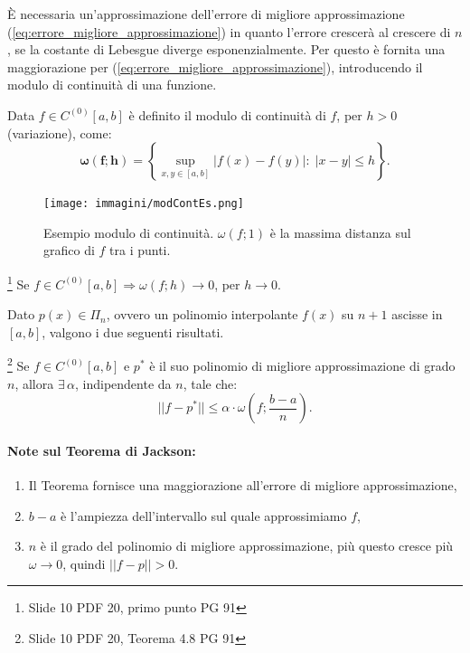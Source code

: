 È necessaria un'approssimazione dell'errore di migliore approssimazione (\ref{eq:errore_migliore_approssimazione}) in quanto l'errore crescerà al crescere di $n$, se la costante di Lebesgue diverge esponenzialmente. Per questo è fornita una maggiorazione per (\ref{eq:errore_migliore_approssimazione}), introducendo il modulo di continuità di una funzione.

\begin{definition}
    Data $f\in C^{(0)}[a,b]$ è definito il modulo di continuità di $f$, per $h>0$ (variazione), come:
    \begin{equation}\label{eq:modulo_continuità}
        \boldsymbol{\omega(f;h)}=\left\{\underset{x,y\in [a,b]}{\sup}|f(x)-f(y)|:\; |x-y|\leq h\right\}.
    \end{equation}
\end{definition}

\begin{figure}
    \centering
    \texttt{[image: immagini/modContEs.png]}
    \caption{Esempio modulo di continuità. $\omega (f;1)$ è la massima distanza sul grafico di $f$ tra i punti.}\label{fig:modContEs}
\end{figure}

\begin{theorem}\label{th:modulo_continuità}\footnote{Slide 10 PDF 20, primo punto PG 91}
    Se $f\in C^{(0)}[a,b]\Rightarrow\omega (f;h)\rightarrow 0$, per $h\rightarrow 0$.
\end{theorem}

Dato $p(x)\in\Pi_n$, ovvero un polinomio interpolante $f(x)$ su $n+1$ ascisse in $[a,b]$, valgono i due seguenti risultati.

\begin{theorem}[Jackson]\label{th:Jackson}\footnote{Slide 10 PDF 20, Teorema 4.8 PG 91}
    Se $f\in C^{(0)}[a,b]$ e $p^*$ è il suo polinomio di migliore approssimazione di grado $n$, allora $\exists\, \alpha$, indipendente da $n$, tale che:
    \begin{equation}\label{eq:approssimazione_jackson}
        ||f-p^*||\leq \alpha\cdot\omega\left(f;\frac{b-a}{n}\right).
    \end{equation}
\end{theorem}

\paragraph{Note sul Teorema di Jackson:}
\begin{enumerate}
	\item Il Teorema fornisce una maggiorazione all'errore di migliore approssimazione,
	\item $b-a$ è l'ampiezza dell'intervallo sul quale approssimiamo $f$,
	\item $n$ è il grado del polinomio di migliore approssimazione, più questo cresce più $\omega\rightarrow 0$, quindi $||f-p||>0$.
\end{enumerate}

